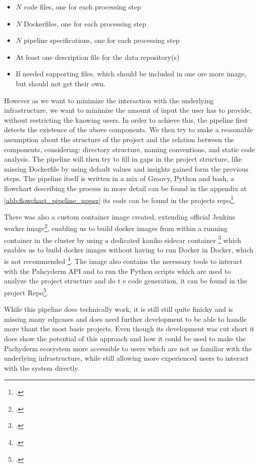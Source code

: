 \begin{itemize}
    \item $N$ code files, one for each processing step
    \item $N$ Dockerfiles, one for each processing step
    \item $N$ pipeline specifications, one for each processing step
    \item At least one description file for the data repository(s)
    \item If needed supporting files, which should be included in one ore more image, but should not get their own.
\end{itemize}

However as we want to minimize the interaction with the underlying infrastructure, we want to minimize the amount of input the user has to provide, without restricting the knowing users.
In order to achieve this, the pipeline first detects the existence of the above components.
We then try to make a reasonable assumption about the structure of the project and the relation between the components, considering: directory structure, naming conventions, and static code analysis.
The pipeline will then try to fill in gaps in the project structure, like missing Dockerfile by using default values and insights gained form the previous steps.
The pipeline itself is written in a mix of Groovy, Python and bash, a flowchart describing the process in more detail can be found in the appendix at \ref{abb:flowchart_pipeline_upper} its code can be found in the projects repo\footcite{eckerthProjectRepoJenkins}.

There was also a custom container image created, extending official Jenkins worker image\footcite{JenkinsJenkinsDocker}, enabling us to build docker images from within a running container in the cluster by using a dedicated kaniko 
sidecar container \footcite{KanikoBuildImages2023} which enables us to build docker images without having to run Docker in Docker, which is not recommended \footcite{UsingDockerinDockerYour}.
The image also contains the necessary tools to interact with the Pahcyderm API and to run the Python scripts which are used to analyze the project structure and do t   e code generation, it can be found in the project Repo\footcite{eckerthProjectRepoJenkinsa}.

While this pipeline does technically work, it is still still quite finicky and is missing many edgcases and does need further development to be able to handle more thant the most basic projects.
Even though its development was cut short it does show the potential of this approach and how it could be used to make the Pachyderm ecosystem more accessible to users which are not as familiar with the underlying infrastructure, 
while still allowing more experienced users to interact with the system directly.